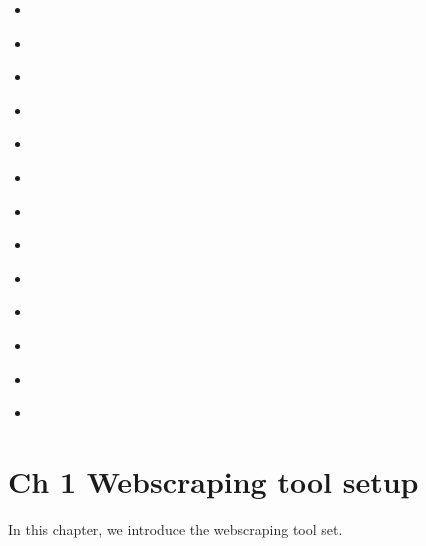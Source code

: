 \documentclass[letterpaper,10pt,english]{jupyterBook}
\begin{document}
\begin{itemize}
\item {} 
\sphinxAtStartPar
{\hyperref[\detokenize{ch41::doc}]{}}

\item {} 
\sphinxAtStartPar
{\hyperref[\detokenize{ch42::doc}]{}}

\item {} 
\sphinxAtStartPar
{\hyperref[\detokenize{ch43::doc}]{}}

\item {} 
\sphinxAtStartPar
{\hyperref[\detokenize{ch44::doc}]{}}

\item {} 
\sphinxAtStartPar
{\hyperref[\detokenize{ch45::doc}]{}}

\item {} 
\sphinxAtStartPar
{\hyperref[\detokenize{ch46::doc}]{}}

\item {} 
\sphinxAtStartPar
{\hyperref[\detokenize{ch47::doc}]{}}

\item {} 
\sphinxAtStartPar
{\hyperref[\detokenize{ch48::doc}]{}}

\item {} 
\sphinxAtStartPar
{\hyperref[\detokenize{ch49::doc}]{}}

\item {} 
\sphinxAtStartPar
{\hyperref[\detokenize{ch50::doc}]{}}

\item {} 
\sphinxAtStartPar
{\hyperref[\detokenize{ch51::doc}]{}}

\item {} 
\sphinxAtStartPar
{\hyperref[\detokenize{ch52::doc}]{}}

\item {} 
\sphinxAtStartPar
{\hyperref[\detokenize{ch53::doc}]{}}

\end{itemize}

\sphinxstepscope


\chapter{Ch 1 Webscraping tool setup}
\label{\detokenize{ch1:ch-1-webscraping-tool-setup}}\label{\detokenize{ch1::doc}}
\sphinxAtStartPar
In this chapter, we introduce the webscraping tool set.
\end{document}
